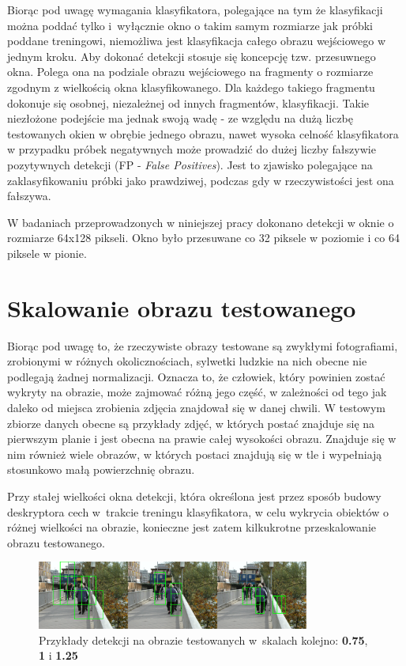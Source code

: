 Biorąc pod uwagę wymagania klasyfikatora, polegające na tym że klasyfikacji można poddać tylko i~wyłącznie okno o takim samym rozmiarze jak próbki poddane treningowi, niemożliwa jest klasyfikacja całego obrazu wejściowego w jednym kroku. Aby dokonać detekcji stosuje się koncepcję tzw. przesuwnego okna. Polega ona na podziale obrazu wejściowego na fragmenty o rozmiarze zgodnym z wielkością okna klasyfikowanego. Dla każdego takiego fragmentu dokonuje się osobnej, niezależnej od innych fragmentów, klasyfikacji. Takie niezłożone podejście ma jednak swoją wadę - ze względu na dużą liczbę testowanych okien w obrębie jednego obrazu, nawet wysoka celność klasyfikatora w przypadku próbek negatywnych może prowadzić do dużej liczby fałszywie pozytywnych detekcji (FP - \textit{False Positives}). Jest to zjawisko polegające na zaklasyfikowaniu próbki jako prawdziwej, podczas gdy w rzeczywistości jest ona fałszywa.

W badaniach przeprowadzonych w niniejszej pracy dokonano detekcji w oknie o rozmiarze 64x128 pikseli. Okno było przesuwane co 32 piksele w poziomie i co 64 piksele w pionie.

\section{Skalowanie obrazu testowanego}
\label{sec:skalowanie}

Biorąc pod uwagę to, że rzeczywiste obrazy testowane są zwykłymi fotografiami, zrobionymi w różnych okolicznościach, sylwetki ludzkie na nich obecne nie podlegają żadnej normalizacji.
Oznacza to, że człowiek, który powinien zostać wykryty na obrazie, może zajmować różną jego część, w zależności od tego jak daleko od miejsca zrobienia zdjęcia znajdował się w danej chwili. W testowym zbiorze danych obecne są przykłady zdjęć, w których postać znajduje się na pierwszym planie i jest obecna na prawie całej wysokości obrazu. Znajduje się w nim również wiele obrazów, w których postaci znajdują się w tle i wypełniają stosunkowo małą powierzchnię obrazu.

Przy stałej wielkości okna detekcji, która określona jest przez sposób budowy deskryptora cech w~trakcie treningu klasyfikatora, w celu wykrycia obiektów o różnej wielkości na obrazie, konieczne jest zatem kilkukrotne przeskalowanie obrazu testowanego.

\begin{figure}[htb]
\centering
\includegraphics[width=0.8\textwidth]{ch3_scales.png}
\caption{Przykłady detekcji na obrazie testowanych w~skalach kolejno: \textbf{0.75}, \textbf{1} i \textbf{1.25}}
\label{fig:skale}
\end{figure}

